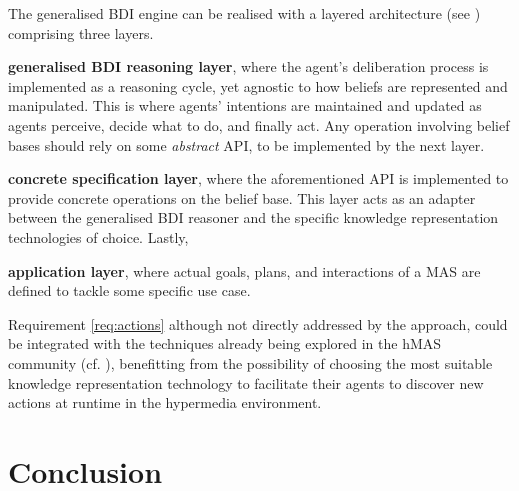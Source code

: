 The generalised \ac{BDI} engine can be realised with a layered architecture (see ) comprising three layers.
%
\begin{enumerate*}[label={\emph{Layer \arabic*}:}]
  \item \textbf{generalised \ac{BDI} reasoning layer},
  where the agent's deliberation process is implemented as a reasoning cycle,
  yet agnostic to how beliefs are represented and manipulated.
  This is where
  agents' intentions are maintained
  and updated as agents perceive,
  decide what to do,
  and finally act.
  Any operation involving belief bases should rely on some \emph{abstract} \acs{API},
  to be implemented by the next layer.
  \item \textbf{concrete specification layer},
  where the aforementioned \acs{API} is implemented to provide concrete operations on the belief base.
  This layer acts as an adapter between the generalised \ac{BDI} reasoner
  and the specific knowledge representation technologies of choice.
  Lastly,
    \item \textbf{application layer},
  where actual goals, plans, and interactions of a \ac{MAS} are defined
  to tackle some specific use case.
\end{enumerate*}


Requirement \ref{req:actions} although not directly addressed by the approach,
could be integrated with the techniques already being explored in the \ac{hMAS} community (cf. ), benefitting from the possibility of choosing the most suitable knowledge representation technology
to facilitate their agents to discover new actions at runtime in the hypermedia environment.

\section{Conclusion}
\label{sec:hypermas:conclusion}

